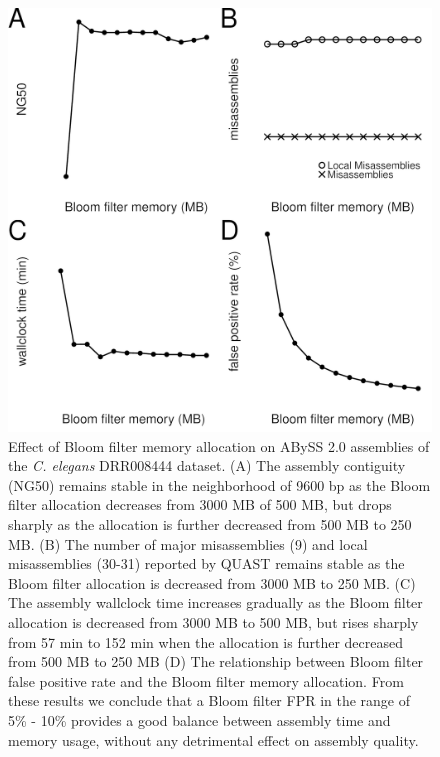 \documentclass[
  12pt,
  oneside,
  openany]{book}
\begin{document}
\begin{figure}
\hypertarget{fig:fpr}{%
\centering
\includegraphics{abyss2/FPR-experiment.png}
\caption[Effect of Bloom filter memory allocation on ABySS 2.0 assemblies of the \emph{C. elegans} DRR008444 dataset.]{Effect of Bloom filter memory allocation on ABySS 2.0 assemblies of the \emph{C. elegans} DRR008444 dataset. (A) The assembly contiguity (NG50) remains stable in the neighborhood of 9600 bp as the Bloom filter allocation decreases from 3000 MB of 500 MB, but drops sharply as the allocation is further decreased from 500 MB to 250 MB. (B) The number of major misassemblies (9) and local misassemblies (30-31) reported by QUAST remains stable as the Bloom filter allocation is decreased from 3000 MB to 250 MB. (C) The assembly wallclock time increases gradually as the Bloom filter allocation is decreased from 3000 MB to 500 MB, but rises sharply from 57 min to 152 min when the allocation is further decreased from 500 MB to 250 MB (D) The relationship between Bloom filter false positive rate and the Bloom filter memory allocation. From these results we conclude that a Bloom filter FPR in the range of 5\% - 10\% provides a good balance between assembly time and memory usage, without any detrimental effect on assembly quality.}\label{fig:fpr}
}
\end{figure}
\end{document}
